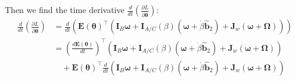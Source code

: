 \documentclass[titlepage]{article}
\begin{document}
Then we find the time derivative $\frac{d}{dt}(\frac{\partial L}{\partial\dot{\boldsymbol{\theta}}})$:
\begin{equation}
	\begin{split}
		\frac{d}{dt}\left(\frac{\partial L}{\partial\dot{\boldsymbol{\theta}}}\right)&=\frac{d}{dt}\left(\boldsymbol{E}(\boldsymbol{\theta})^\top\left(\boldsymbol{I}_B\boldsymbol{\omega}+\boldsymbol{I}_{A/C}(\beta)\left(\boldsymbol{\omega}+\dot{\beta}\hat{\boldsymbol{b}}_2\right)+\boldsymbol{J}_w\left(\boldsymbol{\omega}+\boldsymbol{\Omega}\right)\right)\right) \\
		&=\left(\frac{d\boldsymbol{E}(\boldsymbol{\theta})}{dt}\right)^\top\left(\boldsymbol{I}_B\boldsymbol{\omega}+\boldsymbol{I}_{A/C}(\beta)\left(\boldsymbol{\omega}+\dot{\beta}\hat{\boldsymbol{b}}_2\right)+\boldsymbol{J}_w\left(\boldsymbol{\omega}+\boldsymbol{\Omega}\right)\right) \\
		&\quad+\boldsymbol{E}(\boldsymbol{\theta})^\top\frac{d}{dt}\left(\boldsymbol{I}_B\boldsymbol{\omega}+\boldsymbol{I}_{A/C}(\beta)\left(\boldsymbol{\omega}+\dot{\beta}\hat{\boldsymbol{b}}_2\right)+\boldsymbol{J}_w\left(\boldsymbol{\omega}+\boldsymbol{\Omega}\right)\right)
	\end{split}
\end{equation}
\end{document}
